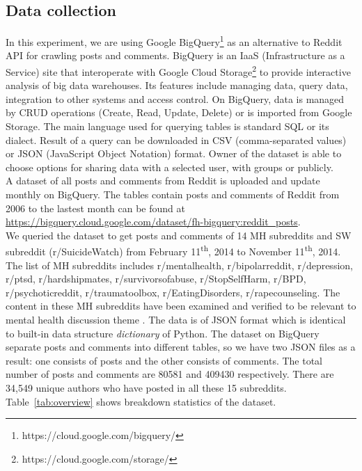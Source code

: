 \subsection{Data collection}
In this experiment, we are using Google BigQuery\footnote{https://cloud.google.com/bigquery/} as an alternative to Reddit API for crawling posts and comments. BigQuery is an IaaS (Infrastructure as a Service) site that interoperate with Google Cloud Storage\footnote{https://cloud.google.com/storage/} to provide interactive analysis of big data warehouses. Its features include managing data, query data, integration to other systems and access control. On BigQuery, data is managed by CRUD operations (Create, Read, Update, Delete) or is imported from Google Storage. The main language used for querying tables is standard SQL or its dialect. Result of a query can be downloaded in CSV (comma-separated values) or JSON (JavaScript Object Notation) format. Owner of the dataset is able to choose options for sharing data with a selected user, with groups or publicly.\\
A dataset of all posts and comments from Reddit is uploaded and update monthly on BigQuery. The tables contain posts and comments of Reddit from 2006 to the lastest month can be found at \url{https://bigquery.cloud.google.com/dataset/fh-bigquery:reddit_posts}.\\
We queried the dataset to get posts and comments of 14 MH subreddits and SW subreddit (r/SuicideWatch) from February 11\textsuperscript{th}, 2014 to November 11\textsuperscript{th}, 2014. The list of MH subreddits includes r/mentalhealth, r/bipolarreddit, r/depression, r/ptsd, r/hardshipmates, r/survivorsofabuse, r/StopSelfHarm, r/BPD,  r/psychoticreddit, r/traumatoolbox, r/EatingDisorders, r/rapecounseling. The content in these MH subreddits have been examined and verified to be relevant to mental health discussion theme \cite{Pavalanathan2015}. The data is of JSON format which is identical to built-in data structure \textit{dictionary} of Python. The dataset on BigQuery separate posts and comments into different tables, so we have two JSON files as a result: one consists of posts and the other consists of comments. The total number of posts and comments are 80581 and 409430 respectively. There are 34,549 unique authors who have posted in all these 15 subreddits. Table~\ref{tab:overview} shows breakdown statistics of the dataset.\\
